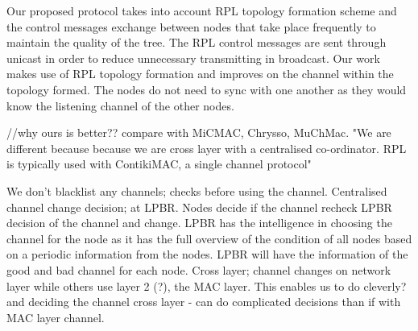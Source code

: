

Our proposed protocol takes into account RPL topology formation scheme and the control messages exchange between nodes that take place frequently to maintain the quality of the tree. The RPL control messages are sent through unicast in order to reduce unnecessary transmitting in broadcast. Our work makes use of RPL topology formation and improves on the channel within the topology formed. The nodes do not need to sync with one another as they would know the listening channel of the other nodes.

//why ours is better?? compare with MiCMAC, Chrysso, MuChMac. "We are different because because we are cross layer with a centralised co-ordinator. RPL is typically used with ContikiMAC, a single channel protocol"

We don't blacklist any channels; checks before using the channel. Centralised channel change decision; at LPBR. Nodes decide if the channel recheck LPBR decision of the channel and change. LPBR has the intelligence in choosing the channel for the node as it has the full overview of the condition of all nodes based on a periodic information from the nodes. LPBR will have the information of the good and bad channel for each node. 
Cross layer; channel changes on network layer while others use layer 2 (?), the MAC layer. This enables us to do cleverly? and deciding the channel cross layer - can do complicated decisions than if with MAC layer channel.



